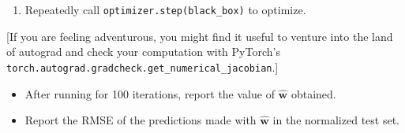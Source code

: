 \documentclass{harvardml}
\begin{document}
\begin{problem}[14pts]
\begin{enumerate}
\begin{verbatim}
    ...

    # Set the gradient of the variable.
    weights.grad = Tensor({numpy})

    return {objective}
\end{verbatim}

\item Repeatedly call \texttt{optimizer.step(black\_box)} to optimize.

\end{enumerate}

[If you are feeling adventurous, you might find it useful to venture
into the land of autograd and check your computation with PyTorch's
\texttt{torch.autograd.gradcheck.get\_numerical\_jacobian}.]

\begin{itemize}
\item After running for 100 iterations, report the value of $\hat{\mathbf{w}}$ obtained.
\item Report the RMSE of the predictions made with $\hat{\mathbf{w}}$ in the normalized test set.
\end{itemize}
\vspace{0.1cm}

\end{problem}
\end{document}
